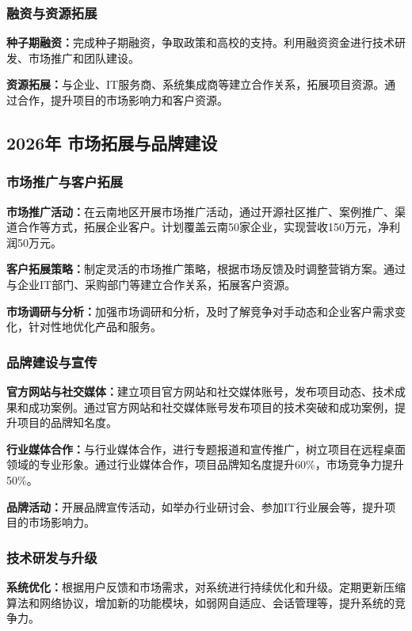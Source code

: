 \documentclass[12pt,a4paper]{article}
\begin{document}
\subsubsection{融资与资源拓展}
\textbf{种子期融资：}完成种子期融资，争取政策和高校的支持。利用融资资金进行技术研发、市场推广和团队建设。

\textbf{资源拓展：}与企业、IT服务商、系统集成商等建立合作关系，拓展项目资源。通过合作，提升项目的市场影响力和客户资源。

\subsection{2026年 市场拓展与品牌建设}

\subsubsection{市场推广与客户拓展}
\textbf{市场推广活动：}在云南地区开展市场推广活动，通过开源社区推广、案例推广、渠道合作等方式，拓展企业客户。计划覆盖云南50家企业，实现营收150万元，净利润50万元。

\textbf{客户拓展策略：}制定灵活的市场推广策略，根据市场反馈及时调整营销方案。通过与企业IT部门、采购部门等建立合作关系，拓展客户资源。

\textbf{市场调研与分析：}加强市场调研和分析，及时了解竞争对手动态和企业客户需求变化，针对性地优化产品和服务。

\subsubsection{品牌建设与宣传}
\textbf{官方网站与社交媒体：}建立项目官方网站和社交媒体账号，发布项目动态、技术成果和成功案例。通过官方网站和社交媒体账号发布项目的技术突破和成功案例，提升项目的品牌知名度。

\textbf{行业媒体合作：}与行业媒体合作，进行专题报道和宣传推广，树立项目在远程桌面领域的专业形象。通过行业媒体合作，项目品牌知名度提升60\%，市场竞争力提升50\%。

\textbf{品牌活动：}开展品牌宣传活动，如举办行业研讨会、参加IT行业展会等，提升项目的市场影响力。

\subsubsection{技术研发与升级}
\textbf{系统优化：}根据用户反馈和市场需求，对系统进行持续优化和升级。定期更新压缩算法和网络协议，增加新的功能模块，如弱网自适应、会话管理等，提升系统的竞争力。
\end{document}
